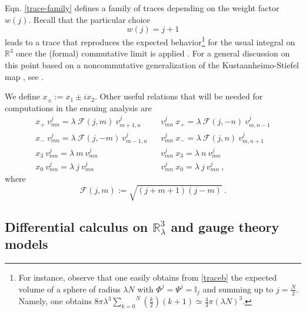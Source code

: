 \documentclass[a4paper,11pt,twoside]{article}
\numberwithin{equation}{section}
\newcommand\bbone{{ \mathbb{I}}}
\theoremstyle{nonumberplain}
\newcounter{and}
\begin{document}
%
Eqn. \eqref{trace-family} defines a family of traces depending on the weight factor $w(j)$. Recall that the particular choice%
\begin{equation}
w(j)=j+1\label{weight-gromov}
\end{equation}
%
leads to a trace that reproduces the expected behavior{\footnote{For instance, observe that one easily obtains from \eqref{traceb} the expected volume of a sphere of radius $\lambda N$ with $\Phi^j=\Psi^j=\bbone_j$ and summing up to $j=\frac{N}{2}$. Namely, one obtains $8\pi\lambda^3\overset{N}{\underset{k=0}{\sum}}\left(\frac{k}{2}\right)(k+1)\simeq\frac43\pi\left(\lambda N\right)^3$.}} for the usual integral on $\mathbb{R}^3$ once the (formal) commutative limit is applied \cite{gervitwal-13}. For a general discussion on this point based on a noncommutative generalization of the Kustaanheimo-Stiefel map \cite{ksmap}, see \cite{pv-ksmap}. \par%
%
We define $x_\pm := x_1\pm i x_2$. Other useful relations \cite{vit-wal-12} that will be needed for computations in the ensuing analysis are%
%
\begin{eqnarray}
x_+ \ v^j_{mn} = \lambda \ \mathcal{F}(j,m) \ v^j_{m+1, n}  
&& v^j_{mn} \ x_+ = \lambda \ \mathcal{F}(j,-n) \ v^j_{m, n -1} \nonumber \\
x_- \ v^j_{mn} = \lambda \ \mathcal{F}(j,-m) \ v^j_{m-1,n}  
&& v^j_{mn} \ x_- = \lambda \ \mathcal{F}(j,n) \ v^j_{m,n +1} \nonumber \\
x_3 \ v^j_{mn} = \lambda \ m \ v^j_{mn}
&& v^j_{mn} \ x_3 = \lambda \ n \ v^j_{mn} \nonumber \\
x_0 \ v^j_{mn} = \lambda \ j \ v^j_{mn}
&& v^j_{mn} \ x_0 = \lambda \ j \ v^j_{mn} \ , \label{x0-commut}
\end{eqnarray}
%
where%
%
\begin{equation}
\mathcal{F}(j,m):=\sqrt{(j+m+1)(j-m)} \ . \label{fjm}
\end{equation}


\subsection{\texorpdfstring{Differential calculus on $\mathbb{R}^3_\lambda$ and gauge theory models}{Family of gauge theories}} \label{subsection22}
\end{document}
